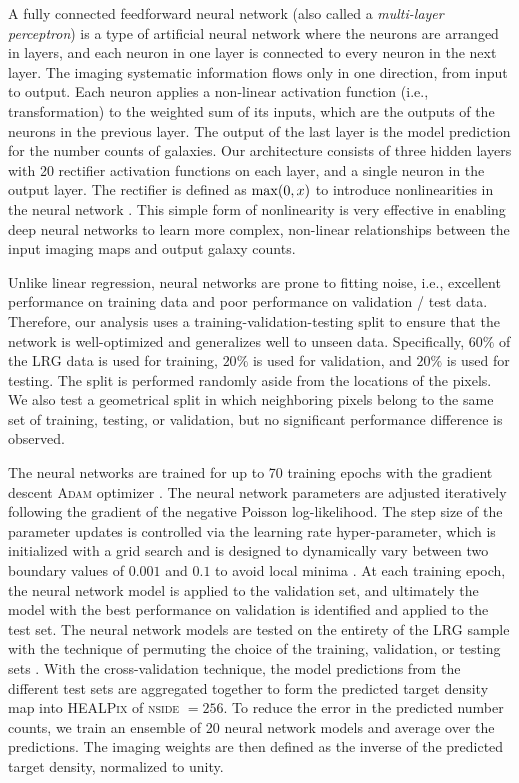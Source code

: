 A fully connected feedforward neural network (also called a \textit{multi-layer perceptron}) is a type of artificial neural network where the neurons are arranged in layers, and each neuron in one layer is connected to every neuron in the next layer. The imaging systematic information flows only in one direction, from input to output. Each neuron applies a non-linear activation function (i.e., transformation) to the weighted sum of its inputs, which are the outputs of the neurons in the previous layer. The output of the last layer is the model prediction for the number counts of galaxies. Our architecture consists of three hidden layers with 20 rectifier activation functions on each layer, and a single neuron in the output layer. The rectifier is defined as ${\rm max}(0, x)$ to introduce nonlinearities in the neural network \citep{nair2010rectified}. This simple form of nonlinearity is very effective in enabling deep neural networks to learn more complex, non-linear relationships between the input imaging maps and output galaxy counts.

Unlike linear regression, neural networks are prone to fitting noise, i.e., excellent performance on training data and poor performance on validation / test data. Therefore, our analysis uses a training-validation-testing split to ensure that the network is well-optimized and generalizes well to unseen data. Specifically, $60\%$ of the LRG data is used for training, $20\%$ is used for validation, and $20\%$ is used for testing. The split is performed randomly aside from the locations of the pixels. We also test a geometrical split in which neighboring pixels belong to the same set of training, testing, or validation, but no significant performance difference is observed.

The neural networks are trained for up to 70 training epochs with the gradient descent \textsc{Adam} optimizer \citep{2017arXiv171105101L}. The neural network parameters are adjusted iteratively following the gradient of the negative Poisson log-likelihood. The step size of the parameter updates is controlled via the learning rate hyper-parameter, which is initialized with a grid search and is designed to dynamically vary between two boundary values of $0.001$ and $0.1$ to avoid local minima \citep[see, also,][]{2016arXiv160803983L}. At each training epoch, the neural network model is applied to the validation set, and ultimately the model with the best performance on validation is identified and applied to the test set. The neural network models are tested on the entirety of the LRG sample with the technique of permuting the choice of the training, validation, or testing sets \citep{arlot2010survey}. With the cross-validation technique, the model predictions from the different test sets are aggregated together to form the predicted target density map into \textsc{HEALPix} of \textsc{nside} $=256$. To reduce the error in the predicted number counts, we train an ensemble of 20 neural network models and average over the predictions. The imaging weights are then defined as the inverse of the predicted target density, normalized to unity.

